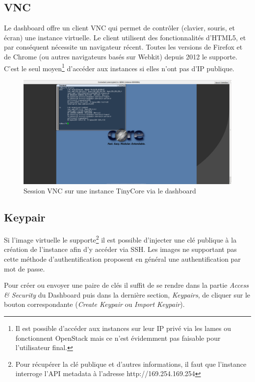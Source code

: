 \documentclass[a4paper,oneside]{report}
\begin{document}
\subsection{VNC}
Le dashboard offre un client VNC qui permet de contrôler (clavier, souris, et écran) une instance virtuelle. Le client utilisent des fonctionnalités d'HTML5, et par conséquent nécessite un navigateur récent. Toutes les versions de Firefox et de Chrome (ou autres navigateurs basés sur Webkit) depuis 2012 le supporte.\newline
C'est le seul moyen\footnote{Il est possible d'accéder aux instances sur leur IP privé via les lames ou fonctionnent OpenStack mais ce n'est évidemment pas faisable pour l'utilisateur final.} d'accéder aux instances si elles n'ont pas d'IP publique.

\begin{figure}[!h]
\centering
\includegraphics[resolution=200]{images/22_vnc.png}
\caption{Session VNC sur une instance TinyCore via le dashboard}
\end{figure}

\subsection{Keypair}
Si l'image virtuelle le supporte\footnote{Pour récupérer la clé publique et d'autres informations, il faut que l'instance interroge l'API metadata à l'adresse http://169.254.169.254} il est possible d'injecter une clé publique à la création de l'instance afin d'y accéder via SSH.
Les images ne supportant pas cette méthode d'authentification proposent en général une authentification par mot de passe.

Pour créer ou envoyer une paire de clés il suffit de se rendre dans la partie \emph{Access \& Security} du Dashboard puis dans la dernière section, \emph{Keypairs}, de cliquer sur le bouton correspondante (\emph{Create Keypair} ou \emph{Import Keypair}).
\end{document}
